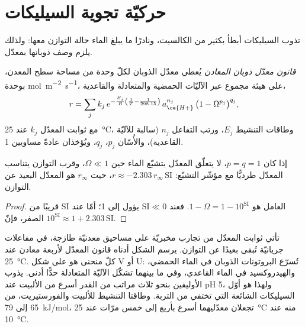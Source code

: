 \section{حركيّة تجوية السيليكات}\label{sec:b3:water-rock-interaction:kinetics}

تذوب السيليكات أبطأ بكثير من الكالسيت، ونادرًا ما يبلغ الماء حالة التوازن معها:
ولذلك يلزم وصف ذوبانها بمعدّل.

\begin{definition}\label{def:b3:water-rock-interaction:rate-law}
\emph{قانون معدّل ذوبان المعادن} يُعطي
معدّل الذوبان لكلّ وحدة من مساحة سطح المعدن، بوحدة
\unit{mol.m^{-2}.s^{-1}}، على هيئة مجموع عبر الآليّات الحمضية والمتعادلة والقاعدية،
\[
r = \sum_j k_j\,e^{-\frac{E_j}{R}\left(\frac1T - \frac1{298.15}\right)}\,
a_{\ce{H+}}^{n_j}\,\bigl(1 - \Omega^{p_j}\bigr)^{q_j},
\]
مع ثوابت المعدّل $k_j$ عند \qty{25}{\celsius}، وطاقات التنشيط $E_j$،
ورتب التفاعل $n_j$ (سالبة للآليّة القاعدية)، والأُسّان
$p_j$، $q_j$، ويُؤخذان عادةً مساويين 1.
\end{definition}

\begin{proposition}\label{prop:b3:water-rock-interaction:affinity}
إذا كان $p = q = 1$، لا يتعلّق المعدّل بتشبّع الماء
حين $\Omega \ll 1$، وقرب التوازن يتناسب المعدّل طرديًّا مع
مؤشّر التشبّع: $r \approx -2.303\,r_\infty\,\mathrm{SI}$، حيث
$r_\infty$ هو المعدّل البعيد عن التوازن.
\end{proposition}

\begin{proof}
العامل هو $1 - \Omega = 1 - 10^{\mathrm{SI}}$. فعند $\mathrm{SI} \ll 0$ يؤول
إلى 1؛ أمّا عند $\mathrm{SI}$ قريبًا من الصفر، فإنّ $10^{\mathrm{SI}} \approx 1 +
2.303\,\mathrm{SI}$.
\end{proof}

تأتي ثوابت المعدّل من تجارب مخبريّة على مساحيق معدنيّة طازجة،
في مفاعلات جريانيّة تُبقى بعيدًا عن التوازن. يرسم الشكل أدناه
قانون المعدّل لأربعة معادن عند \qty{25}{\celsius}. كلّ منحنى هو على شكل V أو
U: تُسرّع البروتونات الذوبان في الماء الحمضي، والهيدروكسيد في الماء القاعدي، وفي
ما بينهما تشكّل الآليّة المتعادلة حدًّا أدنى. يذوب الأوليفين بنحو ثلاث
مراتب من القدر أسرع من الألبيت عند pH 5، ولهذا هو أوّل
السيليكات الشائعة التي تختفي من التربة. وطاقتا التنشيط للألبيت
والفورستيريت، من 65 إلى \qty{79}{kJ/mol}، تجعلان معدّليهما أسرع بأربع إلى خمس
مرّات عند \qty{25}{\celsius} منه عند \qty{10}{\celsius}.

